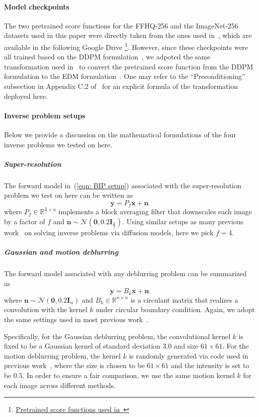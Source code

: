 \documentclass{article}
\numberwithin{equation}{section}
\def\eqref#1{(\ref{#1})}
\def\vzero{{\bm{0}}}
\def\vn{{\bm{n}}}
\def\vx{{\bm{x}}}
\def\vy{{\bm{y}}}
\def\mI{{\bm{I}}}
\def\gN{{\mathcal{N}}}
\begin{document}
\paragraph{Model checkpoints}
The two pretrained score functions for the FFHQ-256 and the ImageNet-256 datasets used in this paper were directly taken from the ones used in~\cite{chung2022diffusion}, which are available in the following Google Drive \footnote{\href{https://drive.google.com/drive/folders/1jElnRoFv7b31fG0v6pTSQkelbSX3xGZh}{Pretrained score functions used in~\cite{chung2022diffusion}}}. However, since these checkpoints were all trained based on the DDPM formulation~\cite{ho2020denoising}, we adpoted the same transformation used in~\cite{wu2024principled} to convert the pretrained score function from the DDPM formulation to the EDM formulation~\cite{karras2022elucidating}. One may refer to the ``Preconditioning'' subsection in Appendix C.2 of~\cite{wu2024principled} for an explicit formula of the transformation deployed here. 

\paragraph{Inverse problem setups} Below we provide a discussion on the mathematical formulations of the four inverse problems we tested on here. 

\subparagraph{Super-resolution} The forward model in~\eqref{eqn: BIP setup} associated with the super-resolution problem we test on here can be written as 
$$\vy = P_{f}\vx + \vn$$
where $P_{f} \in \mathbb{R}^{\frac{n}{f} \times n}$ implements a block averaging filter that downscales each image by a factor of $f$ and $\vn \sim \gN(\vzero, 0.2 \mI_{\frac{n}{f}})$. Using similar setups as many previous work~\cite{chung2022diffusion,kawar2022denoising,wu2024principled} on solving inverse problems via diffusion models, here we pick $f =4$. 

\subparagraph{Gaussian and motion deblurring} The forward model associated with any deblurring problem can be summarized as 
$$\vy = B_{k}\vx + \vn$$
where $\vn \sim \gN(\vzero, 0.2 \mI_{n})$ and $B_{k} \in \mathbb{R}^{n \times n}$ is a circulant matrix that realizes a convolution with the kernel $k$ under circular boundary condition. Again, we adopt the same settings used in most previous work~\cite{chung2022diffusion,kawar2022denoising,wu2024principled}. 

Specifically, for the Gaussian deblurring problem, the convolutional kernel $k$ is fixed to be a Gaussian kernel of standard deviation $3.0$ and size $61 \times 61$. For the motion deblurring problem, the kernel $k$ is randomly generated via code used in previous work~\cite{kawar2022denoising,wu2024principled}, where the size is chosen to be $61 \times 61$ and the intensity is set to be $0.5$. In order to ensure a fair comparison, we use the same motion kernel $k$ for each image across different methods. 
\end{document}
